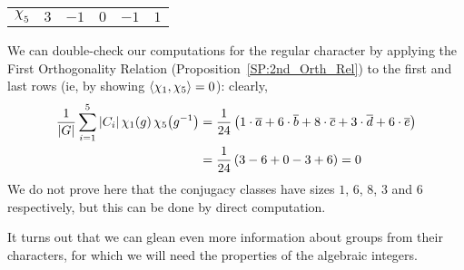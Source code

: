 \begin{boxexample}[$S_4$]
\begin{table}[H]
\begin{tabular}{c|ccccc}
            $\chi_5$ & $3$ & $-1$ & $0$ & $-1$ & $1$
        \end{tabular}
    \end{table}
    We can double-check our computations for the regular character by applying the First Orthogonality Relation (Proposition~\ref{SP:2nd_Orth_Rel}) to the first and last rows (ie, by showing $\left\langle \chi_1, \chi_5 \right\rangle = 0$): clearly,
    \begin{align*}
        \frac{1}{\left\lvert G \right\rvert} \sum_{i=1}^{5} \left\lvert C_i \right\rvert \chi_{1}\!\left( g \right)\chi_{5}\!\left( g^{-1} \right) &= \frac{1}{24} \left( 1 \cdot \overline{a} + 6 \cdot \overline{b} + 8 \cdot \overline{c} + 3 \cdot \overline{d} + 6 \cdot \overline{e} \right) \\
        &= \frac{1}{24}\left( 3 - 6 + 0 - 3 + 6 \right) = 0
    \end{align*}
    We do not prove here that the conjugacy classes have sizes $1$, $6$, $8$, $3$ and $6$ respectively, but this can be done by direct computation.
\end{boxexample}

It turns out that we can glean even more information about groups from their characters, for which we will need the properties of the algebraic integers.